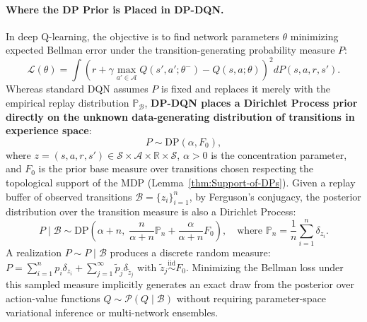 \documentclass[10pt]{article}
\begin{document}
\paragraph{Where the DP Prior is Placed in DP-DQN.}
In deep Q-learning, the objective is to find network parameters $\theta$ minimizing expected Bellman error under the transition-generating probability measure $P$:
\begin{equation}
\mathcal{L}(\theta) = \int \left( r + \gamma \max_{a' \in \mathcal{A}} Q(s', a'; \theta^-) - Q(s, a; \theta) \right)^2 dP(s, a, r, s').
\end{equation}
Whereas standard DQN assumes $P$ is fixed and replaces it merely with the empirical replay distribution $\mathbb{P}_{\mathcal{B}}$, \textbf{DP-DQN places a Dirichlet Process prior directly on the unknown data-generating distribution of transitions in experience space}:
\begin{equation}
P \sim \mathrm{DP}(\alpha, F_0),
\end{equation}
where $z = (s, a, r, s') \in \mathcal{S} \times \mathcal{A} \times \mathbb{R} \times \mathcal{S}$, $\alpha > 0$ is the concentration parameter, and $F_0$ is the prior base measure over transitions chosen respecting the topological support of the MDP (Lemma~\ref{thm:Support-of-DPs}). Given a replay buffer of observed transitions $\mathcal{B} = \{z_i\}_{i=1}^n$, by Ferguson's conjugacy, the posterior distribution over the transition measure is also a Dirichlet Process:
\begin{equation}
P \mid \mathcal{B} \sim \mathrm{DP}\left(\alpha + n, \; \frac{n}{\alpha + n} \mathbb{P}_n + \frac{\alpha}{\alpha + n} F_0\right), \quad \text{where } \mathbb{P}_n = \frac{1}{n} \sum_{i=1}^n \delta_{z_i}.
\end{equation}
A realization $P \sim P \mid \mathcal{B}$ produces a discrete random measure: $P = \sum_{i=1}^n p_i \delta_{z_i} + \sum_{j=1}^\infty \tilde{p}_j \delta_{\tilde{z}_j}$ with $\tilde{z}_j \stackrel{\text{iid}}{\sim} F_0$. Minimizing the Bellman loss under this sampled measure implicitly generates an exact draw from the posterior over action-value functions $Q \sim \mathcal{P}(Q \mid \mathcal{B})$ without requiring parameter-space variational inference or multi-network ensembles.
\end{document}
